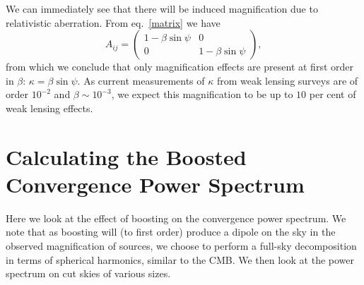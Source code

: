 \documentclass[useAMS,fleqn,usenatbib]{mn2e}
\begin{document}
We can immediately see  that there will be induced magnification due
to relativistic aberration. From eq.~\ref{matrix} we have
\begin{equation}
A_{ij} = \left(\begin{array}{cc}
1-\beta\sin\psi & 0\\
0 & 1-\beta\sin\psi
\end{array}\right),
\end{equation}
from which we conclude that only magnification effects are present
at first order in $\beta$: $\kappa = \beta\sin\psi$. As current measurements of
$\kappa$ from weak lensing surveys are of order $10^{-2}$ and $\beta\sim10^{-3}$,
we expect this magnification to be up to $10$ per cent of weak lensing effects.


\section{Calculating the Boosted Convergence Power Spectrum}
\label{powerspectrum}
Here we look at the effect of boosting on the convergence power spectrum.
We note that as boosting will (to first order) produce a dipole on
the sky in the observed magnification of sources, we choose to perform
a full-sky decomposition in terms of spherical harmonics, similar
to the CMB. We then look at the power spectrum on cut skies of various
sizes.
\end{document}
